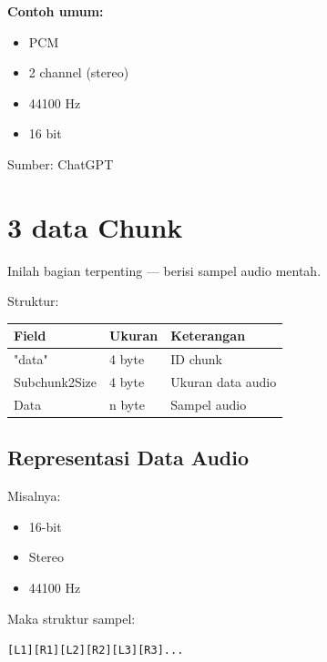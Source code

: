 \documentclass{article}
\begin{document}
{\vspace{20mm}

\begin{flushright}
\textbf{Contoh umum:}
\begin{itemize}
    \item PCM
    \item 2 channel (stereo)
    \item 44100 Hz
    \item 16 bit
\end{itemize}

Sumber: ChatGPT
\end{flushright}

\newpage


\section*{3 data Chunk}

Inilah bagian terpenting --- berisi sampel audio mentah.

Struktur:

\begin{tabular}{|l|l|l|}
\hline
\textbf{Field} & \textbf{Ukuran} & \textbf{Keterangan} \\ \hline
"data" & 4 byte & ID chunk \\ \hline
Subchunk2Size & 4 byte & Ukuran data audio \\ \hline
Data & n byte & Sampel audio \\ \hline
\end{tabular}

\vspace{10mm}

\subsection*{Representasi Data Audio}

Misalnya:
\begin{itemize}
    \item 16-bit
    \item Stereo
    \item 44100 Hz
\end{itemize}

Maka struktur sampel:

\begin{center}
\texttt{[L1][R1][L2][R2][L3][R3]...}
\end{center}

}
\end{document}
